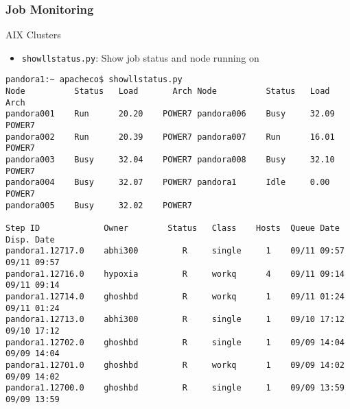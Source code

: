 \documentclass[slidestop,mathserif,compress,xcolor=svgnames,table]{beamer}
\newenvironment{ablock}[0]
{
\begin{beamerboxesrounded}[upper=uppercol,lower=lowercol,shadow=true]}
{\end{beamerboxesrounded}}
\newenvironment{bblock}[0]
{
\begin{beamerboxesrounded}[upper=uppercol1,lower=lowercol1,shadow=true]}
{\end{beamerboxesrounded}}
\begin{document}
\begin{frame}[fragile]
\frametitle{\small Job Monitoring}
\begin{bblock}{AIX Clusters}
\begin{itemize}
\item \texttt{showllstatus.py}: Show job status and node running on
\end{itemize}
\end{bblock}
\begin{ablock}{}
{\tiny
\begin{verbatim}
pandora1:~ apacheco$ showllstatus.py 
Node          Status   Load       Arch Node          Status   Load       Arch
pandora001    Run      20.20    POWER7 pandora006    Busy     32.09    POWER7
pandora002    Run      20.39    POWER7 pandora007    Run      16.01    POWER7
pandora003    Busy     32.04    POWER7 pandora008    Busy     32.10    POWER7
pandora004    Busy     32.07    POWER7 pandora1      Idle     0.00     POWER7
pandora005    Busy     32.02    POWER7 

Step ID             Owner        Status   Class    Hosts  Queue Date   Disp. Date 
pandora1.12717.0    abhi300         R     single     1    09/11 09:57  09/11 09:57
pandora1.12716.0    hypoxia         R     workq      4    09/11 09:14  09/11 09:14
pandora1.12714.0    ghoshbd         R     workq      1    09/11 01:24  09/11 01:24
pandora1.12713.0    abhi300         R     single     1    09/10 17:12  09/10 17:12
pandora1.12702.0    ghoshbd         R     single     1    09/09 14:04  09/09 14:04
pandora1.12701.0    ghoshbd         R     workq      1    09/09 14:02  09/09 14:02
pandora1.12700.0    ghoshbd         R     single     1    09/09 13:59  09/09 13:59
\end{verbatim}
}
\end{ablock}
\end{frame}
\end{document}
